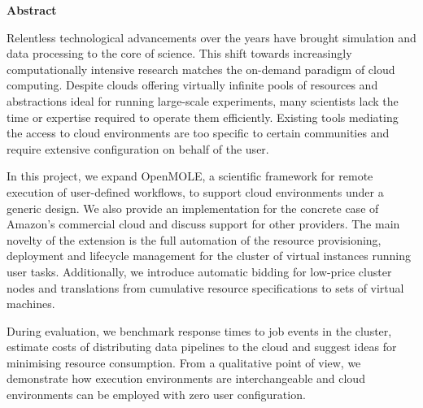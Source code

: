 \thispagestyle{empty}

\begin{center}
\vspace*{4cm}
\textbf{Abstract}
\end{center}

\vspace*{0.3cm}
\begin{spacing}{1.0}
Relentless technological advancements over the years have brought simulation and data processing to the core of science. This shift towards increasingly computationally intensive research matches the on-demand paradigm of cloud computing. Despite clouds offering virtually infinite pools of resources and abstractions ideal for running large-scale experiments, many scientists lack the time or expertise required to operate them efficiently. Existing tools mediating the access to cloud environments are too specific to certain communities and require extensive configuration on behalf of the user. 

In this project, we expand OpenMOLE, a scientific framework for remote execution of user-defined workflows, to support cloud environments under a generic design. We also provide an implementation for the concrete case of Amazon's commercial cloud and discuss support for other providers. The main novelty of the extension is the full automation of the resource provisioning, deployment and lifecycle management for the cluster of virtual instances running user tasks. Additionally, we introduce automatic bidding for low-price cluster nodes and translations from cumulative resource specifications to sets of virtual machines.

During evaluation, we benchmark response times to job events in the cluster, estimate costs of distributing data pipelines to the cloud and suggest ideas for minimising resource consumption. From a qualitative point of view, we demonstrate how execution environments are interchangeable and cloud environments can be employed with zero user configuration.
\end{spacing}

\newpage
\blankpage









